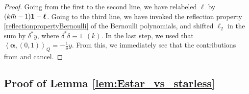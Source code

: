 \documentclass[pdftex]{sigma}
\def\bal{\boldsymbol{\alpha}}
\def\bol{\boldsymbol{\ell}}
\theoremstyle{definition}
\numberwithin{equation}{section}
\begin{document}
\begin{proof}
Going from the first to the second line, we have relabeled $\bol$ by $(k\bar m-1){\bf 1}-\bol$. Going to the third line, we have invoked the reflection property \eqref{reflectionpropertyBernoulli} of the Bernoulli polynomials, and shifted $\ell_2$ in the sum by $\delta^\ast y$, where $\delta^\ast \delta \equiv 1 ~~(k) $. In the last step, we used that $\left<\bal,(0,1)\right>_Q = -{\frac{1}{\delta} } y$. From this, we immediately see that the contributions from \smash{$\bal_w^{(1)}$} and \smash{$\bal_w^{(2)}$} cancel.
\end{proof}

\subsection{Proof of Lemma \ref{lem:Estar_vs_starless}}\label{apx:proofEstar_vs_starless}
\end{document}
